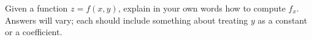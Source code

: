 {Given a function $z=f(x,y)$, explain in your own words how to compute $f_x$.
}
{Answers will vary; each should include something about treating $y$ as a constant or a coefficient.
}